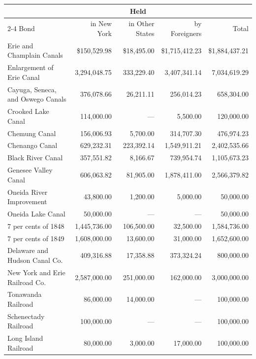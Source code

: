 \documentclass[11pt]{article}
\newcommand{\STRUT}{\rule{0in}{3ex}}
\begin{document}
\begin{table}[htbp]
\centering
\small
\begin{tabular}{lrrrr}
      & \multicolumn{3}{c}{Held}\\
      \cline{2-4}
Bond  & in New York &  in Other States  & by Foreigners & Total \STRUT \\
\hline
Erie and Champlain Canals         & \$150,529.98 & \$18,495.00 & \$1,715,412.23 & \$1,884,437.21\STRUT\\
Enlargement of Erie Canal         & 3,294,048.75 & 333,229.40  & 3,407,341.14   & 7,034,619.29 \\
Cayuga, Seneca, and Oswego Canals & 376,078.66   & 26,211.11   & 256,014.23     & 658,304.00 \\
Crooked Lake Canal                & 114,000.00   & ---         & 5,500.00       & 120,000.00 \\
Chemung Canal                     & 156,006.93   & 5,700.00    & 314,707.30     & 476,974.23 \\
Chenango Canal                    & 629,232.31   & 223,392.14  & 1,549,911.21   & 2,402,535.66 \\
Black River Canal                 & 357,551.82   & 8,166.67    & 739,954.74     & 1,105,673.23 \\
Genesee Valley Canal              & 606,063.82   & 81,905.00   & 1,878,411.00   & 2,566,379.82 \\
Oneida River Improvement          & 43,800.00    & 1,200.00    & 5,000.00       & 50,000.00 \\
Oneida Lake Canal                 & 50,000.00    & ---         & ---            & 50,000.00 \\
7 per cents of 1848               & 1,445,736.00 & 106,500.00  & 32,500.00      & 1,584,736.00 \\
7 per cents of 1849               & 1,608,000.00 & 13,600.00   & 31,000.00      & 1,652,600.00 \\
Delaware and Hudson Canal Co.     & 409,316.88   & 17,358.88   & 373,324.24     & 800,000.00 \\
New York and Erie Railroad Co.    & 2,587,000.00 & 251,000.00  & 162,000.00     & 3,000,000.00 \\
Tonawanda Railroad                & 86,000.00    & 14,000.00   & ---            & 100,000.00 \\
Schenectady Railroad              & 100,000.00   & ---         & ---            & 100,000.00 \\
Long Island Railroad              & 80,000.00    & 3,000.00    & 17,000.00      & 100,000.00 \\

\end{tabular}
\end{table}
\end{document}

